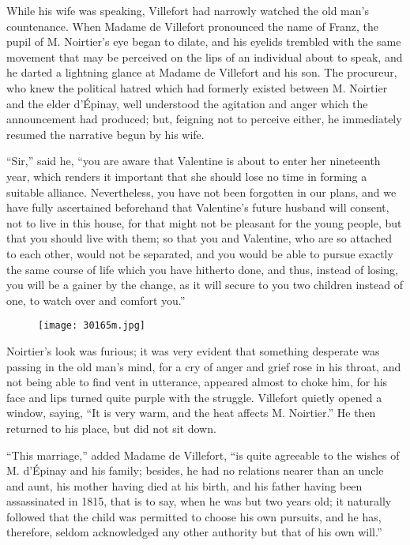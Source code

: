 While his wife was speaking, Villefort had narrowly watched the old
man’s countenance. When Madame de Villefort pronounced the name of
Franz, the pupil of M. Noirtier’s eye began to dilate, and his eyelids
trembled with the same movement that may be perceived on the lips of an
individual about to speak, and he darted a lightning glance at Madame
de Villefort and his son. The procureur, who knew the political hatred
which had formerly existed between M. Noirtier and the elder d’Épinay,
well understood the agitation and anger which the announcement had
produced; but, feigning not to perceive either, he immediately resumed
the narrative begun by his wife.

“Sir,” said he, “you are aware that Valentine is about to enter her
nineteenth year, which renders it important that she should lose no
time in forming a suitable alliance. Nevertheless, you have not been
forgotten in our plans, and we have fully ascertained beforehand that
Valentine’s future husband will consent, not to live in this house, for
that might not be pleasant for the young people, but that you should
live with them; so that you and Valentine, who are so attached to each
other, would not be separated, and you would be able to pursue exactly
the same course of life which you have hitherto done, and thus, instead
of losing, you will be a gainer by the change, as it will secure to you
two children instead of one, to watch over and comfort you.”

\begin{figure}[ht]
\texttt{[image: 30165m.jpg]}
\end{figure}

Noirtier’s look was furious; it was very evident that something
desperate was passing in the old man’s mind, for a cry of anger and
grief rose in his throat, and not being able to find vent in utterance,
appeared almost to choke him, for his face and lips turned quite purple
with the struggle. Villefort quietly opened a window, saying, “It is
very warm, and the heat affects M. Noirtier.” He then returned to his
place, but did not sit down.

“This marriage,” added Madame de Villefort, “is quite agreeable to the
wishes of M. d’Épinay and his family; besides, he had no relations
nearer than an uncle and aunt, his mother having died at his birth, and
his father having been assassinated in 1815, that is to say, when he
was but two years old; it naturally followed that the child was
permitted to choose his own pursuits, and he has, therefore, seldom
acknowledged any other authority but that of his own will.”


